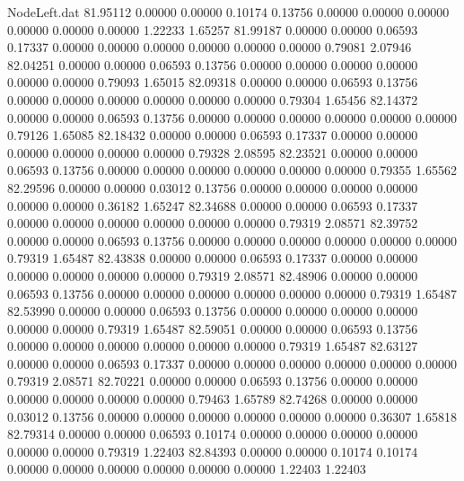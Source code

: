 \begin{filecontents}{NodeLeft.dat}
  81.95112    0.00000    0.00000     0.10174    0.13756    0.00000    0.00000    0.00000    0.00000    0.00000    0.00000    1.22233    1.65257
  81.99187    0.00000    0.00000     0.06593    0.17337    0.00000    0.00000    0.00000    0.00000    0.00000    0.00000    0.79081    2.07946
  82.04251    0.00000    0.00000     0.06593    0.13756    0.00000    0.00000    0.00000    0.00000    0.00000    0.00000    0.79093    1.65015
  82.09318    0.00000    0.00000     0.06593    0.13756    0.00000    0.00000    0.00000    0.00000    0.00000    0.00000    0.79304    1.65456
  82.14372    0.00000    0.00000     0.06593    0.13756    0.00000    0.00000    0.00000    0.00000    0.00000    0.00000    0.79126    1.65085
  82.18432    0.00000    0.00000     0.06593    0.17337    0.00000    0.00000    0.00000    0.00000    0.00000    0.00000    0.79328    2.08595
  82.23521    0.00000    0.00000     0.06593    0.13756    0.00000    0.00000    0.00000    0.00000    0.00000    0.00000    0.79355    1.65562
  82.29596    0.00000    0.00000     0.03012    0.13756    0.00000    0.00000    0.00000    0.00000    0.00000    0.00000    0.36182    1.65247
  82.34688    0.00000    0.00000     0.06593    0.17337    0.00000    0.00000    0.00000    0.00000    0.00000    0.00000    0.79319    2.08571
  82.39752    0.00000    0.00000     0.06593    0.13756    0.00000    0.00000    0.00000    0.00000    0.00000    0.00000    0.79319    1.65487
  82.43838    0.00000    0.00000     0.06593    0.17337    0.00000    0.00000    0.00000    0.00000    0.00000    0.00000    0.79319    2.08571
  82.48906    0.00000    0.00000     0.06593    0.13756    0.00000    0.00000    0.00000    0.00000    0.00000    0.00000    0.79319    1.65487
  82.53990    0.00000    0.00000     0.06593    0.13756    0.00000    0.00000    0.00000    0.00000    0.00000    0.00000    0.79319    1.65487
  82.59051    0.00000    0.00000     0.06593    0.13756    0.00000    0.00000    0.00000    0.00000    0.00000    0.00000    0.79319    1.65487
  82.63127    0.00000    0.00000     0.06593    0.17337    0.00000    0.00000    0.00000    0.00000    0.00000    0.00000    0.79319    2.08571
  82.70221    0.00000    0.00000     0.06593    0.13756    0.00000    0.00000    0.00000    0.00000    0.00000    0.00000    0.79463    1.65789
  82.74268    0.00000    0.00000     0.03012    0.13756    0.00000    0.00000    0.00000    0.00000    0.00000    0.00000    0.36307    1.65818
  82.79314    0.00000    0.00000     0.06593    0.10174    0.00000    0.00000    0.00000    0.00000    0.00000    0.00000    0.79319    1.22403
  82.84393    0.00000    0.00000     0.10174    0.10174    0.00000    0.00000    0.00000    0.00000    0.00000    0.00000    1.22403    1.22403

\end{filecontents}

